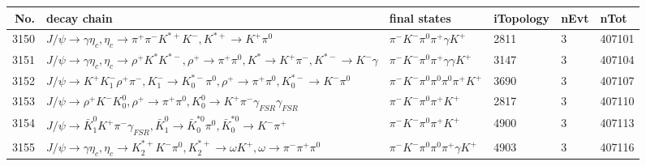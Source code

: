 \begin{table}[htbp] 
\begin{center}
\begin{small}
\begin{tabular}{rlllll}\hline\hline
 No. & decay chain & final states &  iTopology & nEvt & nTot \\\hline
3150&$J/\psi       \rightarrow \gamma       \eta_{c}    , \eta_{c}     \rightarrow \pi^{+}        \pi^{-}        K^{*+}         K^{-}          , K^{*+}          \rightarrow K^{+}          \pi^{0}        $&$\pi^{-}        K^{-}          \pi^{0}        \pi^{+}        \gamma       K^{+}          $& 2811&    3&407101\\
3151&$J/\psi       \rightarrow \gamma       \eta_{c}    , \eta_{c}     \rightarrow \rho^{+}      K^{*}          K^{*-}         , \rho^{+}       \rightarrow \pi^{+}        \pi^{0}        , K^{*}           \rightarrow K^{+}          \pi^{-}        , K^{*-}          \rightarrow K^{-}          \gamma       $&$\pi^{-}        K^{-}          \pi^{0}        \pi^{+}        \gamma       \gamma       K^{+}          $& 3147&    3&407104\\
3152&$J/\psi       \rightarrow K^{+}          K_{1}^{-}      \rho^{+}      \pi^{-}        , K_{1}^{-}       \rightarrow K_{0}^{*-}     \pi^{0}        , \rho^{+}       \rightarrow \pi^{+}        \pi^{0}        , K_{0}^{*-}      \rightarrow K^{-}          \pi^{0}        $&$\pi^{-}        K^{-}          \pi^{0}        \pi^{0}        \pi^{0}        \pi^{+}        K^{+}          $& 3690&    3&407107\\
3153&$J/\psi       \rightarrow \rho^{+}      K^{-}          K_0^{0}        , \rho^{+}       \rightarrow \pi^{+}        \pi^{0}        , K_0^{0}         \rightarrow K^{+}          \pi^{-}        \gamma_{FSR} \gamma_{FSR} $&$\pi^{-}        K^{-}          \pi^{0}        \pi^{+}        K^{+}          $& 2817&    3&407110\\
3154&$J/\psi       \rightarrow \bar{K}_1^{0} K^{+}          \pi^{-}        \gamma_{FSR} , \bar{K}_1^{0}  \rightarrow \bar{K}_0^{*0}\pi^{0}        , \bar{K}_0^{*0} \rightarrow K^{-}          \pi^{+}        $&$\pi^{-}        K^{-}          \pi^{0}        \pi^{+}        K^{+}          $& 4900&    3&407113\\
3155&$J/\psi       \rightarrow \gamma       \eta_{c}    , \eta_{c}     \rightarrow K_2^{*+}       K^{-}          \pi^{0}        , K_2^{*+}        \rightarrow \omega         K^{+}          , \omega          \rightarrow \pi^{-}        \pi^{+}        \pi^{0}        $&$\pi^{-}        K^{-}          \pi^{0}        \pi^{0}        \pi^{+}        \gamma       K^{+}          $& 4903&    3&407116\\

\end{tabular}
\end{small}
\end{center}
\end{table}
